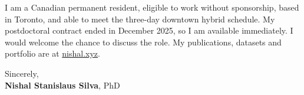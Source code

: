 \documentclass[11pt]{article}
\newcommand{\clName}{Nishal Stanislaus Silva}
\newcommand{\clSite}{https://nishal.xyz}
\begin{document}
I am a Canadian permanent resident, eligible to work without sponsorship, based in Toronto, and able to meet the three-day downtown hybrid schedule. My postdoctoral contract ended in December 2025, so I am available immediately. I would welcome the chance to discuss the role. My publications, datasets and portfolio are at \href{\clSite}{nishal.xyz}.

\vspace{10pt}
Sincerely,\\[2pt]
\textbf{\clName}, PhD
\end{document}
